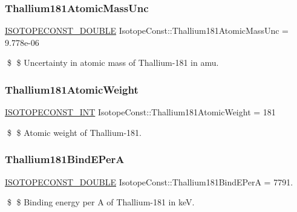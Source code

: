 \subsubsection{\texorpdfstring{Thallium181\+Atomic\+Mass\+Unc}{Thallium181AtomicMassUnc}}
{\footnotesize\ttfamily \mbox{\hyperlink{group___isotope_const-_macros_ga8f45a7272ce02c0b4c65c44636ed719a}{I\+S\+O\+T\+O\+P\+E\+C\+O\+N\+S\+T\+\_\+\+D\+O\+U\+B\+LE}} Isotope\+Const\+::\+Thallium181\+Atomic\+Mass\+Unc = 9.\+778e-\/06}

\$ \$ Uncertainty in atomic mass of Thallium-\/181 in amu. \mbox{\label{group___isotope_const-_thallium-_tl181_ga4d3cf2026dbfbc459ffd2e1157a9be0a}} 
\subsubsection{\texorpdfstring{Thallium181\+Atomic\+Weight}{Thallium181AtomicWeight}}
{\footnotesize\ttfamily \mbox{\hyperlink{group___isotope_const-_macros_ga5f18360b3e99483a35c32d789e62621c}{I\+S\+O\+T\+O\+P\+E\+C\+O\+N\+S\+T\+\_\+\+I\+NT}} Isotope\+Const\+::\+Thallium181\+Atomic\+Weight = 181}

\$ \$ Atomic weight of Thallium-\/181. \mbox{\label{group___isotope_const-_thallium-_tl181_gaf910bda333e8eb9332217a01af898fbf}} 
\subsubsection{\texorpdfstring{Thallium181\+Bind\+E\+PerA}{Thallium181BindEPerA}}
{\footnotesize\ttfamily \mbox{\hyperlink{group___isotope_const-_macros_ga8f45a7272ce02c0b4c65c44636ed719a}{I\+S\+O\+T\+O\+P\+E\+C\+O\+N\+S\+T\+\_\+\+D\+O\+U\+B\+LE}} Isotope\+Const\+::\+Thallium181\+Bind\+E\+PerA = 7791.}

\$ \$ Binding energy per A of Thallium-\/181 in keV. \mbox{\label{group___isotope_const-_thallium-_tl181_gad97d848a525e741a5635c48c98a023f9}} 
